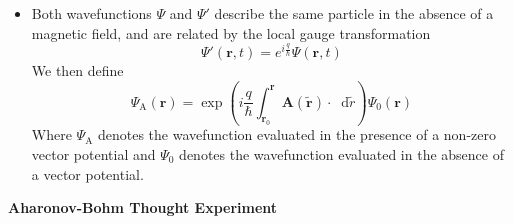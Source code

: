 \documentclass[11pt, a4paper]{article}
\newcommand{\diff}{\mathop{}\!\mathrm{d}} %
\renewcommand{\vec}[1]{\bm{#1}}  %
\renewcommand{\t}[1]{\tilde{#1}}
\renewcommand{\r}{\vec{r}}  %
\newcommand{\A}{\vec{A}}  %
\renewcommand{\P}{\Psi}  %
\begin{document}
\begin{itemize}
	\item Both wavefunctions $ \P $ and $ \P' $ describe the same particle in the absence of a magnetic field, and are related by the local gauge transformation
	\begin{equation*}
		\P'(\r, t) = e^{i\frac{q}{\hbar}} \P(\r, t)
	\end{equation*}
	We then define
	\begin{equation*}
		\P_{\text{A}}(\r) = \exp\left(i\frac{q}{\hbar} \int_{\r_{0}}^{\r}\A(\t{\r})\cdot \diff\t{r}\right) \P_{0}(\r)
	\end{equation*}
	Where $ \P_{\text{A}} $ denotes the wavefunction evaluated in the presence of a non-zero vector potential and $ \P_{0} $ denotes the wavefunction evaluated in the absence of a vector potential.
\end{itemize}
\textbf{Aharonov-Bohm Thought Experiment}
\end{document}

